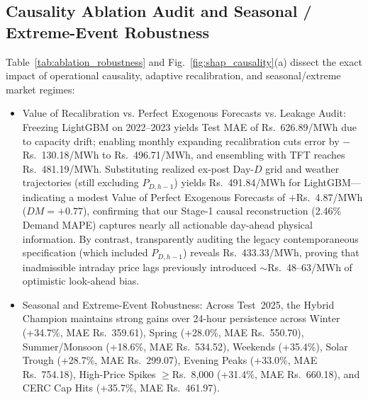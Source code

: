 \documentclass[journal,10pt,twocolumn]{IEEEtran}
\begin{document}
\subsection{Causality Ablation Audit and Seasonal / Extreme-Event Robustness}
Table~\ref{tab:ablation_robustness} and Fig.~\ref{fig:shap_causality}(a) dissect the exact impact of operational causality, adaptive recalibration, and seasonal/extreme market regimes:
\begin{itemize}
    \item Value of Recalibration vs. Perfect Exogenous Forecasts vs. Leakage Audit: Freezing LightGBM on 2022--2023 yields Test MAE of Rs.~626.89/MWh due to capacity drift; enabling monthly expanding recalibration cuts error by $-$Rs.~130.18/MWh to Rs.~496.71/MWh, and ensembling with TFT reaches Rs.~481.19/MWh. Substituting realized ex-post Day-$D$ grid and weather trajectories (still excluding $P_{D,h-1}$) yields Rs.~491.84/MWh for LightGBM---indicating a modest Value of Perfect Exogenous Forecasts of $+$Rs.~4.87/MWh ($DM = +0.77$), confirming that our Stage-1 causal reconstruction (2.46\% Demand MAPE) captures nearly all actionable day-ahead physical information. By contrast, transparently auditing the legacy contemporaneous specification (which included $P_{D,h-1}$) reveals Rs.~433.33/MWh, proving that inadmissible intraday price lags previously introduced $\sim$Rs.~48--63/MWh of optimistic look-ahead bias.
    \item Seasonal and Extreme-Event Robustness: Across Test~2025, the Hybrid Champion maintains strong gains over 24-hour persistence across Winter (+34.7\%, MAE Rs.~359.61), Spring (+28.0\%, MAE Rs.~550.70), Summer/Monsoon (+18.6\%, MAE Rs.~534.52), Weekends (+35.4\%), Solar Trough (+28.7\%, MAE Rs.~299.07), Evening Peaks (+33.0\%, MAE Rs.~754.18), High-Price Spikes $\ge$Rs.~8,000 (+31.4\%, MAE Rs.~660.18), and CERC Cap Hits (+35.7\%, MAE Rs.~461.97).
\end{itemize}
\end{document}

